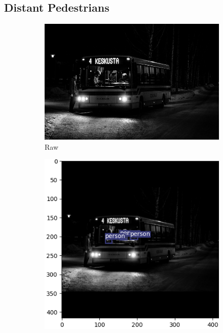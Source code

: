 \subsection{Distant Pedestrians}
\begin{figure}[!htbp]
\centering
\begin{subfigure}{.2\textwidth}
  \centering
  \includegraphics[width=\textwidth]{images/bus.jpg}
  \caption{Raw}
  \label{fig:ogbus}
\end{subfigure}%
\begin{subfigure}{.2\textwidth}
  \centering
  \includegraphics[width=\textwidth]{images/base_bus.png}

\end{subfigure}
\end{figure}

